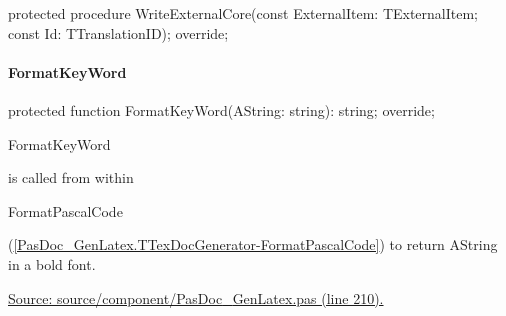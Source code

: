 \documentclass{report}
\newif\ifpdf
\begin{document}
\label{PasDoc_GenLatex.TTexDocGenerator-WriteExternalCore}
\begin{list}{}{
\setlength{\itemindent}{0cm}
\setlength{\listparindent}{0cm}
\setlength{\leftmargin}{\evensidemargin}
\addtolength{\leftmargin}{\tmplength}
\settowidth{\labelsep}{X}
\addtolength{\leftmargin}{\labelsep}
\setlength{\labelwidth}{\tmplength}
}
\item[\textbf{Declaration}\hfill]
\ifpdf
\begin{flushleft}
\fi
\begin{ttfamily}
protected procedure WriteExternalCore(const ExternalItem: TExternalItem; const Id: TTranslationID); override;\end{ttfamily}

\ifpdf
\end{flushleft}
\fi

\end{list}
\paragraph*{FormatKeyWord}\hspace*{\fill}

\label{PasDoc_GenLatex.TTexDocGenerator-FormatKeyWord}
\begin{list}{}{
\setlength{\itemindent}{0cm}
\setlength{\listparindent}{0cm}
\setlength{\leftmargin}{\evensidemargin}
\addtolength{\leftmargin}{\tmplength}
\settowidth{\labelsep}{X}
\addtolength{\leftmargin}{\labelsep}
\setlength{\labelwidth}{\tmplength}
}
\item[\textbf{Declaration}\hfill]
\ifpdf
\begin{flushleft}
\fi
\begin{ttfamily}
protected function FormatKeyWord(AString: string): string; override;\end{ttfamily}

\ifpdf
\end{flushleft}
\fi

\par
\item[\textbf{Description}]
\begin{ttfamily}FormatKeyWord\end{ttfamily} is called from within \begin{ttfamily}FormatPascalCode\end{ttfamily}(\ref{PasDoc_GenLatex.TTexDocGenerator-FormatPascalCode}) to return AString in a bold font.\par
\href{https://github.com/pasdoc/pasdoc/blob/master/source/component/PasDoc_GenLatex.pas#L210}{Source: source/component/PasDoc{\_}GenLatex.pas (line 210).}

\end{list}
\end{document}
